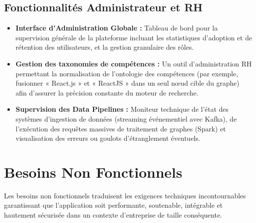 \documentclass[12pt,a4paper]{article}
\begin{document}
\subsection{Fonctionnalités Administrateur et RH}
\begin{itemize}[leftmargin=*]
    \item \textbf{Interface d'Administration Globale :} Tableau de bord pour la supervision générale de la plateforme incluant les statistiques d'adoption et de rétention des utilisateurs, et la gestion granulaire des rôles.
    \item \textbf{Gestion des taxonomies de compétences :} Un outil d'administration RH permettant la normalisation de l'ontologie des compétences (par exemple, fusionner « React.js » et « ReactJS » dans un seul nœud cible du graphe) afin d'assurer la précision constante du moteur de recherche.
    \item \textbf{Supervision des Data Pipelines :} Moniteur technique de l'état des systèmes d'ingestion de données (streaming événementiel avec Kafka), de l'exécution des requêtes massives de traitement de graphes (Spark) et visualisation des erreurs ou goulots d'étranglement éventuels.
\end{itemize}

\section{Besoins Non Fonctionnels}

Les besoins non fonctionnels traduisent les exigences techniques incontournables garantissant que l'application soit performante, soutenable, intégrable et hautement sécurisée dans un contexte d'entreprise de taille conséquente.
\end{document}
